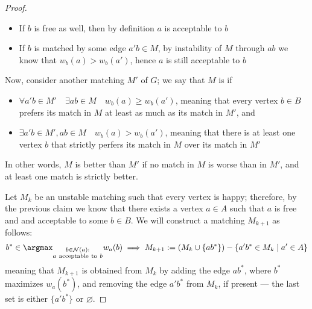 \documentclass[a4paper, 12pt]{report}
\begin{document}
\begin{proof}
{            \begin{itemize}
                \item If $b$ is free as well, then by definition $a$ is acceptable to $b$
                \item If $b$ is matched by some edge $a'b \in M$, by instability of $M$ through $ab$ we know that $w_b(a) > w_b(a')$, hence $a$ is still acceptable to $b$
            \end{itemize}
        }

        Now, consider another matching $M'$ of $G$; we say that $M$ is  if 

        \begin{itemize}
            \item $\forall a'b \in M' \quad \exists ab \in M \quad w_b(a) \ge w_b(a')$, meaning that every vertex $b \in B$ prefers its match in $M$ at least as much as its match in $M'$, and
            \item $\exists a'b \in M', ab \in M \quad w_b(a) > w_b(a')$, meaning that there is at least one vertex $b$ that strictly perfers its match in $M$ over its match in $M'$
        \end{itemize}
        
        In other words, $M$ is better than $M'$ if no match in $M$ is worse than in $M'$, and at least one match is strictly better.

        Let $M_k$ be an unstable matching such that every vertex is happy; therefore, by the previous claim we know that there exists a vertex $a \in A$ such that $a$ is free and and acceptable to some $b \in B$. We will construct a matching $M_{k + 1}$ as follows: $$b^* \in \argmax_{\substack{b \in \mathcal N (a) : \\ a \ \mathrm{acceptable \ to} \ b}}{w_a(b)} \implies M_{k + 1} := (M_k \cup \{ab^*\}) - \{a'b^* \in M_k \mid a' \in A\}$$ meaning that $M_{k + 1}$ is obtained from $M_k$ by adding the edge $ab^*$, where $b^*$ maximizes $w_a(b^*)$, and removing the edge $a'b^*$ from $M_k$, if present --- the last set is either $\{a'b^*\}$ or $\varnothing$.

\end{proof}
\end{document}
